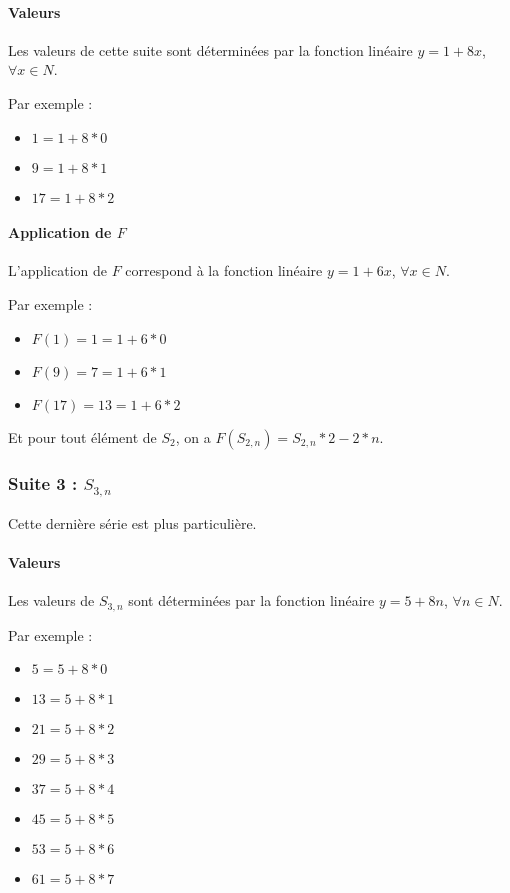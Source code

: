 \documentclass{book}
\begin{document}
\paragraph{Valeurs}

Les valeurs de cette suite sont d\'etermin\'ees par la fonction lin\'eaire $y = 1 + 8x$, $\forall x \in N$.

Par exemple :

\begin{itemize}
	\item $1 = 1 + 8 * 0$
	\item $9 = 1 + 8 * 1$
	\item $17 = 1 + 8 * 2$
\end{itemize}

\paragraph{Application de $F$}

L'application de $F$ correspond \`a la fonction lin\'eaire $y = 1 + 6x$, $\forall x \in N$.

Par exemple :

\begin{itemize}
	\item $F(1) = 1 = 1 + 6 * 0$
	\item $F(9) = 7 = 1 + 6 * 1$
	\item $F(17) = 13 = 1 + 6 * 2$
\end{itemize}

Et pour tout \'el\'ement de $S_2$, on a $F(S_{2,n}) = S_{2,n} * 2  - 2 * n$.

\subsubsection{Suite 3 : $S_{3,n}$}

Cette derni\`ere s\'erie est plus particuli\`ere.

\paragraph{Valeurs}

Les valeurs de $S_{3,n}$ sont d\'etermin\'ees par la fonction lin\'eaire $y = 5 + 8n$, $\forall n \in N$.

Par exemple :

\begin{itemize}
	\item $5 = 5 + 8 * 0$
	\item $13 = 5 + 8 * 1$
	\item $21 = 5 + 8 * 2$
	\item $29 = 5 + 8 * 3$
	\item $37 = 5 + 8 * 4$
	\item $45 = 5 + 8 * 5$
	\item $53 = 5 + 8 * 6$
	\item $61 = 5 + 8 * 7$
\end{itemize}
\end{document}
